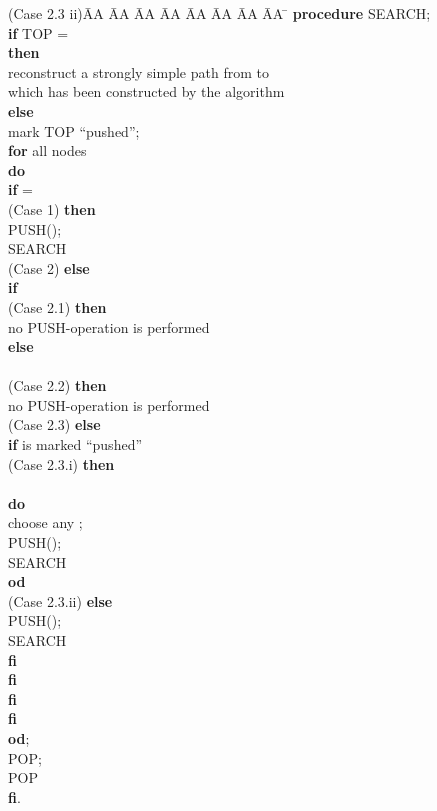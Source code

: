 \documentclass[12pt,twoside,a4paper]{article}
\begin{document}
\begin{tabbing}
(Case 2.3 ii)\= AA \= AA \= AA \= AA \= AA \= AA \= AA \= AA \= \kill \> {\bf procedure} SEARCH; \\
\> {\bf if} TOP =  \\
\> {\bf then} \\
\> \> reconstruct a strongly simple path  from  to  \\ 
\> \> which has been constructed by the algorithm \\
\> {\bf else} \\ 
\> \> mark TOP ``pushed''; \\
\> \> {\bf for} all nodes  \\
\> \> {\bf do} \\
\> \> \> {\bf if}  =  \\
(Case 1) \> \> \> {\bf then} \\
\> \> \> \> PUSH(); \\
\> \> \> \> SEARCH \\
(Case 2) \> \> \> {\bf else} \\
\> \> \> \> {\bf if}  \\
(Case 2.1) \> \> \> \> {\bf then} \\
\> \> \> \> \> no PUSH-operation is performed \\
\> \> \> \> {\bf else} \\
\> \> \> \>   \\
(Case 2.2) \> \> \> \> \> {\bf then} \\
\> \> \> \> \> \>no PUSH-operation is performed \\
(Case 2.3) \> \> \> \> \> {\bf else} \\
\> \> \> \> \> \> {\bf if}  is marked ``pushed''  \\
(Case 2.3.i) \> \> \> \> \> \> {\bf then} \\
\> \> \> \> \> \>    \\
\> \> \> \> \> \> \> {\bf do} \\
\> \> \> \> \> \> \> \> choose any ; \\
\> \> \> \> \> \> \> \> PUSH(); \\
\> \> \> \> \> \> \> \> SEARCH \\
\> \> \> \> \> \> \> {\bf od} \\
(Case 2.3.ii)\> \> \> \> \> \> {\bf else} \\
\> \> \> \> \> \> \> PUSH(); \\
\> \> \> \> \> \> \> SEARCH \\
\> \> \> \> \> \> {\bf fi} \\
\> \> \> \> \> {\bf fi} \\
\> \> \> \> {\bf fi} \\
\> \> \> {\bf fi} \\
\> \> {\bf od};\\
\> \> POP; \\
\> \> POP \\
\> {\bf fi}.
\end{tabbing}
\end{document}
